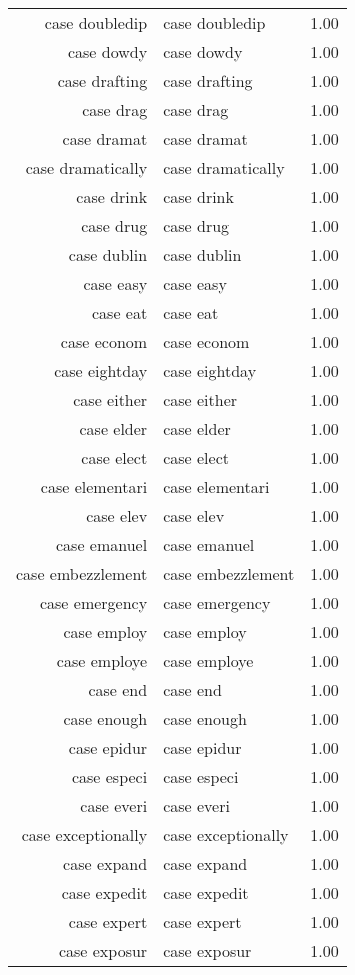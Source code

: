 \begin{table}[ht]
\begin{tabular}{rlr}
  case doubledip & case doubledip & 1.00 \\ 
  case dowdy & case dowdy & 1.00 \\ 
  case drafting & case drafting & 1.00 \\ 
  case drag & case drag & 1.00 \\ 
  case dramat & case dramat & 1.00 \\ 
  case dramatically & case dramatically & 1.00 \\ 
  case drink & case drink & 1.00 \\ 
  case drug & case drug & 1.00 \\ 
  case dublin & case dublin & 1.00 \\ 
  case easy & case easy & 1.00 \\ 
  case eat & case eat & 1.00 \\ 
  case econom & case econom & 1.00 \\ 
  case eightday & case eightday & 1.00 \\ 
  case either & case either & 1.00 \\ 
  case elder & case elder & 1.00 \\ 
  case elect & case elect & 1.00 \\ 
  case elementari & case elementari & 1.00 \\ 
  case elev & case elev & 1.00 \\ 
  case emanuel & case emanuel & 1.00 \\ 
  case embezzlement & case embezzlement & 1.00 \\ 
  case emergency & case emergency & 1.00 \\ 
  case employ & case employ & 1.00 \\ 
  case employe & case employe & 1.00 \\ 
  case end & case end & 1.00 \\ 
  case enough & case enough & 1.00 \\ 
  case epidur & case epidur & 1.00 \\ 
  case especi & case especi & 1.00 \\ 
  case everi & case everi & 1.00 \\ 
  case exceptionally & case exceptionally & 1.00 \\ 
  case expand & case expand & 1.00 \\ 
  case expedit & case expedit & 1.00 \\ 
  case expert & case expert & 1.00 \\ 
  case exposur & case exposur & 1.00 \\ 

\end{tabular}
\end{table}
